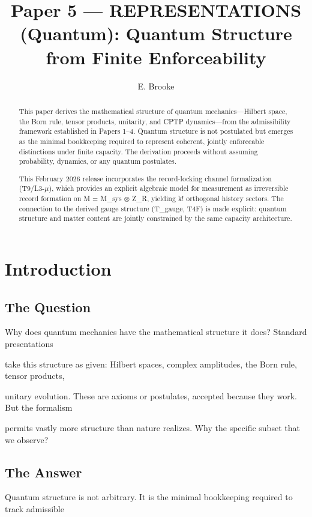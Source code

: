 \documentclass[11pt]{article}
\title{Paper 5 --- REPRESENTATIONS (Quantum): Quantum Structure from Finite Enforceability}
\author{E. Brooke}
\date{}
\begin{document}
\maketitle
\begin{abstract}
This paper derives the mathematical structure of quantum mechanics---Hilbert space, the Born
 rule, tensor products, unitarity, and CPTP dynamics---from the admissibility framework established
 in Papers 1--4. Quantum structure is not postulated but emerges as the minimal bookkeeping
 required to represent coherent, jointly enforceable distinctions under finite capacity. The derivation
 proceeds without assuming probability, dynamics, or any quantum postulates.

 This February 2026 release incorporates the record-locking channel formalization (T9/L3-$\mu$), which
 provides an explicit algebraic model for measurement as irreversible record formation on M =
 M_sys $\otimes$ Z_R, yielding k! orthogonal history sectors. The connection to the derived gauge
 structure (T_gauge, T4F) is made explicit: quantum structure and matter content are jointly
 constrained by the same capacity architecture.
\end{abstract}

\section{Introduction}



\subsection{The Question}

Why does quantum mechanics have the mathematical structure it does? Standard presentations

take this structure as given: Hilbert spaces, complex amplitudes, the Born rule, tensor products,

unitary evolution. These are axioms or postulates, accepted because they work. But the formalism

permits vastly more structure than nature realizes. Why the specific subset that we observe?



\subsection{The Answer}

Quantum structure is not arbitrary. It is the minimal bookkeeping required to track admissible
\end{document}
